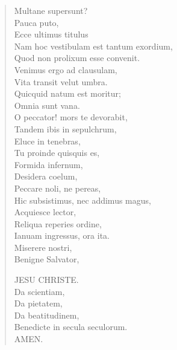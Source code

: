 \documentclass[12pt,  postvopaper]{memoir}
\begin{document}
\begin{verse}

  Multane supersunt?\\
  Pauca puto,\\
  Ecce ultimus titulus \\
  Nam hoc vestibulam est tantum exordium,\\
  Quod non prolixum esse convenit.\\
  Venimus ergo ad clausulam,\\
  Vita transit velut umbra.\\
  Quicquid natum est moritur;\\
  Omnia sunt vana.\\
  O peccator! mors te devorabit,\\
  Tandem ibis in sepulchrum,\\
  Eluce in tenebras,\\
  Tu proinde quisquis es,\\
  Formida infernum,\\
  Desidera coelum,\\
  Peccare noli, ne pereas,\\
  Hic subsistimus, nec addimus magus,\\
  Acquiesce lector,\\
  Reliqua reperies ordine,\\
  Ianuam ingressus, ora ita.\\
  Miserere nostri,\\
  Benigne Salvator,\\
  \begin{altverse}
    JESU CHRISTE.\\
    Da scientiam,\\
    Da pietatem,\\
    Da beatitudinem,\\
    Benedicte in secula seculorum.\\
    AMEN.\\
  \end{altverse}
\end{verse}

\printindex
\end{document}
